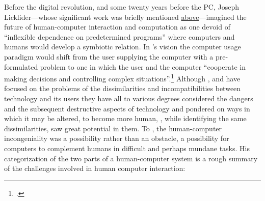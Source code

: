 

Before the digital revolution, and some twenty years before the PC, Joseph Licklider---whose significant work was briefly mentioned \hyperref[sec:human-comp-inter]{above}---imagined the future of human-computer interaction and computation as one devoid of ``inflexible dependence on predetermined programs'' where computers and humans would develop a symbiotic relation. In \citeauthor{licklider60}'s vision the computer usage paradigm would shift from the user supplying the computer with a pre-formulated problem to one in which the user and the computer ``cooperate in making decisions and controlling complex situations''.\footcite{licklider60} Although \citeauthor{heidegger93}, \citeauthor{baudrillard02} and \citeauthor{evens05} have focused on the problems of the dissimilarities and incompatibilities between technology and its users they have all to various degrees considered the dangers and the subsequent destructive aspects of technology and pondered on ways in which it may be altered, to become more human, \citeauthor{licklider60}, while identifying the same dissimilarities, saw great potential in them. To \citeauthor{licklider60}, the human-computer incongeniality was a possibility rather than an obstacle, a possibility for computers to complement humans in difficult and perhaps mundane tasks. His categorization of the two parts of a human-computer system is a rough summary of the challenges involved in human computer interaction:

